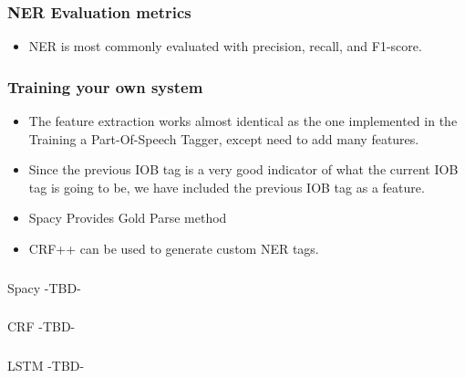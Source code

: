 \begin{frame}[fragile]\frametitle{NER Evaluation metrics}
  \begin{itemize}
  \item NER is most commonly evaluated with precision, recall, and F1-score.
  \end{itemize}
\end{frame}


\begin{frame}[fragile]\frametitle{Training your own system}
  \begin{itemize}
  \item The feature extraction works almost identical as the one implemented in the Training a Part-Of-Speech Tagger, except need to add many features.
  \item Since the previous IOB tag is a very good indicator of what the current IOB tag is going to be, we have included the previous IOB tag as a feature.
  \item Spacy Provides Gold Parse method
  \item CRF++ can be used to generate custom NER tags.
  \end{itemize}
\end{frame}

\begin{frame}[fragile]\frametitle{}

\begin{center}
{\Large Spacy -TBD-}
\end{center}
\end{frame}


\begin{frame}[fragile]\frametitle{}

\begin{center}
{\Large CRF -TBD-}
\end{center}
\end{frame}


\begin{frame}[fragile]\frametitle{}

\begin{center}
{\Large LSTM -TBD-}
\end{center}
\end{frame}
